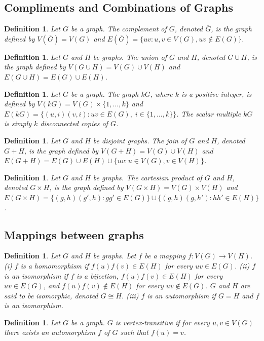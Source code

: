 \documentclass[11pt]{article}
\newtheorem{definition}[theorem]{Definition}
\begin{document}
\subsection{Compliments and Combinations of Graphs}
\begin{definition}
Let $G$ be a graph. The complement of $G$, denoted $\overline{G}$, is the graph defined by $V(\overline{G})=V(G)$ and $E(\overline{G})=\{uv: u,v\in V(G), uv\notin E(G)\}$.
\end{definition}
\begin{definition}
Let $G$ and $H$ be graphs. The union of $G$ and $H$, denoted $G\cup H$, is the graph defined by 
$V(G\cup H)=V(G)\cup V(H)$ and 
$E(G\cup H)=E(G)\cup E(H)$.
\end{definition}
\begin{definition}
Let $G$ be a graph. The graph $kG$, where $k$ is a positive integer, is defined by 
$V(kG)=V(G)\times\{1,\dots,k\}$ and 
$E(kG)=\{(u,i)(v,i): uv\in E(G),\;i\in\{1,\dots,k\}\}$. 
The scalar multiple $kG$ is simply $k$ disconnected copies of $G$.
\end{definition}
\begin{definition}
Let $G$ and $H$ be disjoint graphs. The join of $G$ and $H$, denoted $G+H$, is the graph defined by 
$V(G+H)=V(G)\cup V(H)$ and 
$E(G+H)=E(G)\cup E(H)\cup\{uv: u\in V(G), v\in V(H)\}$.
\end{definition}
\begin{definition}
Let $G$ and $H$ be graphs. The cartesian product of $G$ and $H$, denoted $G\times H$, is the graph defined by 
$V(G\times H)=V(G)\times V(H)$ and 
$E(G\times H)=\{(g,h)(g',h): gg'\in E(G)\}\cup\{(g,h)(g,h'): hh'\in E(H)\}$.
\end{definition}
\subsection{Mappings between graphs}
\begin{definition}
Let $G$ and $H$ be graphs. Let $f$ be a mapping $f:V(G)\to V(H)$. 
(i) $f$ is a homomorphism if $f(u)f(v)\in E(H)$ for every $uv\in E(G)$. 
(ii) $f$ is an isomorphism if $f$ is a bijection, $f(u)f(v)\in E(H)$ for every $uv\in E(G)$, and $f(u)f(v)\notin E(H)$ for every $uv\notin E(G)$. $G$ and $H$ are said to be isomorphic, denoted $G\cong H$. 
(iii) $f$ is an automorphism if $G=H$ and $f$ is an isomorphism.
\end{definition}
\begin{definition}
Let $G$ be a graph. $G$ is vertex-transitive if for every $u,v\in V(G)$ there exists an automorphism $f$ of $G$ such that $f(u)=v$.
\end{definition}
\end{document}
